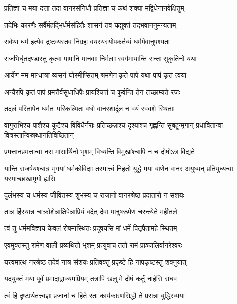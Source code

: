 \twolineshloka
{प्रतिज्ञा च मया दत्ता तदा वानरसंनिधौ}
{प्रतिज्ञा च कथं शक्या मद्विधेनानवेक्षितुम्} %

\twolineshloka
{तदेभिः कारणैः सर्वैर्महद्भिर्धर्मसंहितैः}
{शासनं तव यद्युक्तं तद्भवाननुमन्यताम्} %

\twolineshloka
{सर्वथा धर्म इत्येव द्रष्टव्यस्तव निग्रहः}
{वयस्यस्योपकर्तव्यं धर्ममेवानुपश्यता} %

\twolineshloka
{राजभिर्धृतदण्डास्तु कृत्वा पापानि मानवाः}
{निर्मलाः स्वर्गमायान्ति सन्तः सुकृतिनो यथा} %

\twolineshloka
{आर्येण मम मान्धात्रा व्यसनं घोरमीप्सितम्}
{श्रमणेन कृते पापे यथा पापं कृतं त्वया} %

\twolineshloka
{अन्यैरपि कृतं पापं प्रमत्तैर्वसुधाधिपैः}
{प्रायश्चित्तं च कुर्वन्ति तेन तच्छाम्यते रजः} %

\twolineshloka
{तदलं परितापेन धर्मतः परिकल्पितः}
{वधो वानरशार्दूल न वयं स्ववशे स्थिताः} %

\threelineshloka
{वागुराभिश्च पाशैश्च कूटैश्च विविधैर्नराः}
{प्रतिच्छन्नाश्च दृश्याश्च गृह्णन्ति सुबहून्मृगान्}
{प्रधावितान्वा वित्रस्तान्विस्रब्धानतिविष्ठितान्} %

\twolineshloka
{प्रमत्तानप्रमत्तान्वा नरा मांसार्थिनो भृशम्}
{विध्यन्ति विमुखांश्चापि न च दोषोऽत्र विद्यते} %

\threelineshloka
{यान्ति राजर्षयश्चात्र मृगयां धर्मकोविदाः}
{तस्मात्त्वं निहतो युद्धे मया बाणेन वानर}
{अयुध्यन् प्रतियुध्यन्वा यस्माच्छाखामृगो ह्यसि} %

\twolineshloka
{दुर्लभस्य च धर्मस्य जीवितस्य शुभस्य च}
{राजानो वानरश्रेष्ठ प्रदातारो न संशयः} %

\twolineshloka
{तान्न हिंस्यान्न चाक्रोशेन्नाक्षिपेन्नाप्रियं वदेत्}
{देवा मानुषरूपेण चरन्त्येते महीतले} %

\twolineshloka
{त्वं तु धर्ममविज्ञाय केवलं रोषमास्थितः}
{प्रदूषयसि मां धर्मे पितृपैतामहे स्थितम्} %

\twolineshloka
{एवमुक्तस्तु रामेण वाली प्रव्यथितो भृशम्}
{प्रत्युवाच ततो रामं प्राञ्जलिर्वानरेश्वरः} %

\twolineshloka
{यत्त्वमात्थ नरश्रेष्ठ तदेवं नात्र संशयः}
{प्रतिवक्तुं प्रकृष्टे हि नापकृष्टस्तु शक्नुयात्} %

\twolineshloka
{यदयुक्तं मया पूर्वं प्रमादाद्वाक्यमप्रियम्}
{तत्रापि खलु मे दोषं कर्तुं नार्हसि राघव} %

\twolineshloka
{त्वं हि दृष्टार्थतत्त्वज्ञः प्रजानां च हिते रतः}
{कार्यकारणसिद्धौ ते प्रसन्ना बुद्धिरव्यया} %

